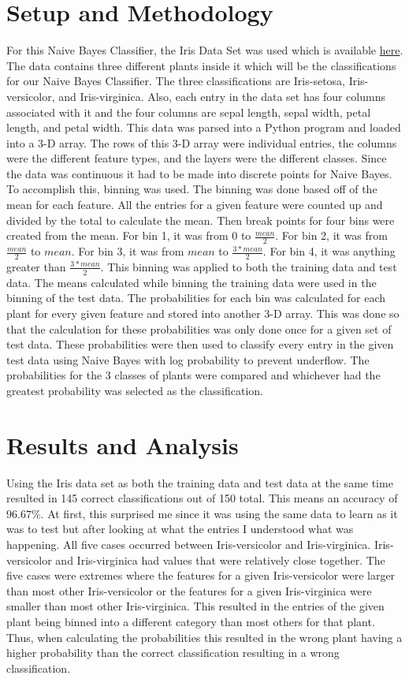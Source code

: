 \documentclass{article}
\begin{document}
\section{Setup and Methodology}
\quad For this Naive Bayes Classifier, the Iris Data Set was used which is available
\href{https://archive.ics.uci.edu/ml/datasets/iris}{here}. The data contains three different plants inside it which will be the classifications for our Naive Bayes Classifier. The three classifications are Iris-setosa, Iris-versicolor, and Iris-virginica. Also, each entry in the data set has four columns associated with it and the four columns are sepal length, sepal width, petal length, and petal width.
This data was parsed into a Python program and loaded into a 3-D array. The rows of this 3-D array were individual entries, the columns were the different feature types, and the layers were the different classes. Since the data was continuous it had to be made into discrete points for Naive Bayes. To accomplish this, binning was used. The binning was done based off of the mean for each feature. All the entries for a given feature were counted up and divided by the total to calculate the mean. Then break points for four bins were created from the mean. For bin 1, it was from $0$ to $\frac{mean}{2}$. For bin 2, it was from $\frac{mean}{2}$ to $mean$. For bin 3, it was from $mean$ to $\frac{3 * mean}{2}$. For bin 4, it was anything greater than $\frac{3*mean}{2}$. This binning was applied to both the training data and test data. The means calculated while binning the training data were used in the binning of the test data. The probabilities for each bin was calculated for each plant for every given feature and stored into another 3-D array. This was done so that the calculation for these probabilities was only done once for a given set of test data. These probabilities were then used to classify every entry in the given test data using Naive Bayes with log probability to prevent underflow. The probabilities for the 3 classes of plants were compared and whichever had the greatest probability was selected as the classification.

\section{Results and Analysis}
\quad Using the Iris data set as both the training data and test data at the same time resulted in 145 correct classifications out of 150 total. This means an accuracy of $96.67\%$. At first, this surprised me since it was using the same data to learn as it was to test but after looking at what the entries I understood what was happening. All five cases occurred between Iris-versicolor and Iris-virginica. Iris-versicolor and Iris-virginica had values that were relatively close together. The five cases were extremes where the features for a given Iris-versicolor were larger than most other Iris-versicolor or the features for a given Iris-virginica were smaller than most other Iris-virginica. This resulted in the entries of the given plant being binned into a different category than most others for that plant. Thus, when calculating the probabilities this resulted in the wrong plant having a higher probability than the correct classification resulting in a wrong classification.
\end{document}
